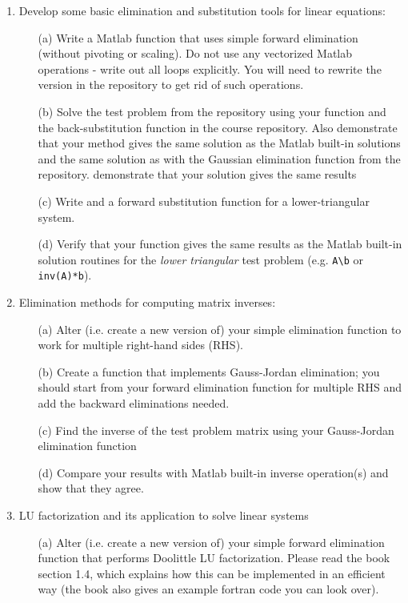 \documentclass{article}
\begin{document}
\pagebreak

\begin{enumerate}
  \item Develop some basic elimination and substitution tools for linear equations:   
  \begin{itemize}
    \item[(a)] Write a Matlab function that uses simple forward elimination (without pivoting or scaling).  Do not use any vectorized Matlab operations - write out all loops explicitly.  You will need to rewrite the version in the repository to get rid of such operations.  
    \item[(b)] Solve the test problem from the repository using your function and the back-substitution function in the course repository.   Also demonstrate that your method gives the same solution as the Matlab built-in solutions and the same solution as with the Gaussian elimination function from the repository.  
    demonstrate that your solution gives the same results 
    \item[(c)] Write and a forward substitution function for a lower-triangular system.  
    \item[(d)] Verify that your function gives the same results as the Matlab built-in solution routines for the \emph{lower triangular} test problem (e.g. \texttt{A\textbackslash b} or \texttt{inv(A)*b}).  
  \end{itemize}
  \item Elimination methods for computing matrix inverses:  
  \begin{itemize}
    \item[(a)] Alter (i.e. create a new version of) your simple elimination function to work for multiple right-hand sides (RHS).  
    \item[(b)] Create a function that implements Gauss-Jordan elimination; you should start from your forward elimination function for multiple RHS and add the backward eliminations needed.  
    \item[(c)] Find the inverse of the test problem matrix using your Gauss-Jordan elimination function
    \item[(d)] Compare your results with Matlab built-in inverse operation(s) and show that they agree.
  \end{itemize}
  \item LU factorization and its application to solve linear systems
  \begin{itemize}
    \item[(a)] Alter (i.e. create a new version of) your simple forward elimination function that performs Doolittle LU factorization.  Please read the book section 1.4, which explains how this can be implemented in an efficient way (the book also gives an example fortran code you can look over).  

\end{itemize}
\end{enumerate}
\end{document}
